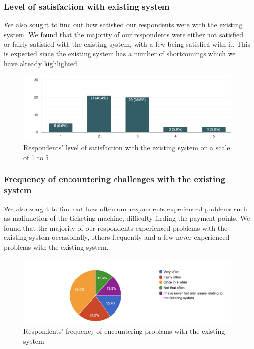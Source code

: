 \clearpage

\subsubsection{Level of satisfaction with existing system}

We also sought to find out how satisfied our respondents were with the existing system. We found that the majority of our respondents were either not satisfied or fairly satisfied with the existing system, with a few being satisfied with it. This is expected since the existing system has a number of shortcomings which we have already highlighted.

\begin{figure}[h]
    \begin{center}
        \hspace{-3cm}
        \includegraphics[scale = 0.5]{images/satisfaction}
        \caption{Respondents' level of satisfaction with the existing system on a scale of 1 to 5}
    \end{center}
\end{figure}

\clearpage

\subsubsection{Frequency of encountering challenges with the existing system}
We also sought to find out how often our respondents experienced problems such as malfunction of the ticketing machine, difficulty finding the payment points. We found that the majority of our respondents experienced problems with the existing system occasionally, others frequently and a few never experienced problems with the existing system.

\begin{figure}[h]
    \begin{center}
        \hspace{-3cm}
        \includegraphics[scale = 0.6]{images/prob-freq}
        \caption{Respondents' frequency of encountering problems with the existing system}
    \end{center}
\end{figure}

